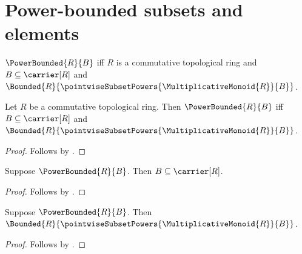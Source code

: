 




\section{Power-bounded subsets and elements}

\begin{definition}\label{power_bounded_set}
    $\PowerBounded{R}{B}$ iff
        $R$ is a commutative topological ring and
        $B\subseteq\carrier[R]$ and
        $\Bounded{R}{\pointwiseSubsetPowers{
            \MultiplicativeMonoid{R}}{B}}$.
\end{definition}

\begin{proposition}\label{power_bounded_set_iff}
    Let $R$ be a commutative topological ring.
    Then $\PowerBounded{R}{B}$ iff
        $B\subseteq\carrier[R]$ and
        $\Bounded{R}{\pointwiseSubsetPowers{
            \MultiplicativeMonoid{R}}{B}}$.
\end{proposition}
\begin{proof}
    Follows by .
\end{proof}

\begin{proposition}\label{power_bounded_set_carrier}
    Suppose $\PowerBounded{R}{B}$.
    Then $B\subseteq\carrier[R]$.
\end{proposition}
\begin{proof}
    Follows by .
\end{proof}

\begin{proposition}\label{power_bounded_set_powers_bounded}
    Suppose $\PowerBounded{R}{B}$.
    Then $\Bounded{R}{\pointwiseSubsetPowers{
        \MultiplicativeMonoid{R}}{B}}$.
\end{proposition}
\begin{proof}
    Follows by .
\end{proof}

